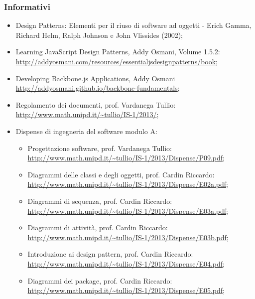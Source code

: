 \subsubsection{Informativi}
\begin{itemize}
\item Design Patterns: Elementi per il riuso di software ad oggetti - Erich Gamma,
Richard Helm, Ralph Johnson e John Vlissides (2002);

\item Learning JavaScript Design Patterns, Addy Osmani, Volume 1.5.2:\\
\url{http://addyosmani.com/resources/essentialjsdesignpatterns/book};

\item Developing Backbone.js Applications, Addy Osmani\\
\url{http://addyosmani.github.io/backbone-fundamentals};

\item Regolamento dei documenti, prof. Vardanega Tullio:\\
\url{http://www.math.unipd.it/~tullio/IS-1/2013/};

\item Dispense di ingegneria del software modulo A:
\begin{itemize}
\item Progettazione software, prof. Vardanega Tullio:\\
\url{http://www.math.unipd.it/~tullio/IS-1/2013/Dispense/P09.pdf};

\item Diagrammi delle classi e degli oggetti, prof. Cardin Riccardo:\\
\url{http://www.math.unipd.it/~tullio/IS-1/2013/Dispense/E02a.pdf};

\item Diagrammi di sequenza, prof. Cardin Riccardo:\\
\url{http://www.math.unipd.it/~tullio/IS-1/2013/Dispense/E03a.pdf};

\item Diagrammi di attività, prof. Cardin Riccardo:\\
\url{http://www.math.unipd.it/~tullio/IS-1/2013/Dispense/E03b.pdf};

\item Introduzione ai design pattern, prof. Cardin Riccardo:\\
\url{http://www.math.unipd.it/~tullio/IS-1/2013/Dispense/E04.pdf};

\item Diagrammi dei package, prof. Cardin Riccardo:\\
\url{http://www.math.unipd.it/~tullio/IS-1/2013/Dispense/E05.pdf};
\end{itemize}



\end{itemize}

